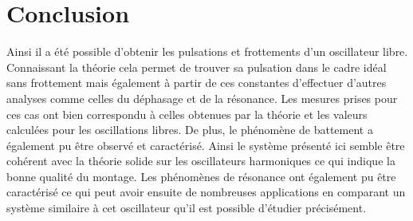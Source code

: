 \section{Conclusion}
Ainsi il a été possible d'obtenir les pulsations et frottements d'un oscillateur libre. Connaissant la théorie cela permet de trouver sa pulsation dans le cadre idéal sans frottement mais également à partir de ces constantes d'effectuer d'autres analyses comme celles du déphasage et de la résonance. Les mesures prises pour ces cas ont bien correspondu à celles obtenues par la théorie et les valeurs calculées pour les oscillations libres. De plus, le phénomène de battement a également pu être observé et caractérisé. Ainsi le système présenté ici semble être cohérent avec la théorie solide sur les oscillateurs harmoniques ce qui indique la bonne qualité du montage. Les phénomènes de résonance ont également pu être caractérisé ce qui peut avoir ensuite de nombreuses applications en comparant un système similaire à cet oscillateur qu'il est possible d'étudier précisément.